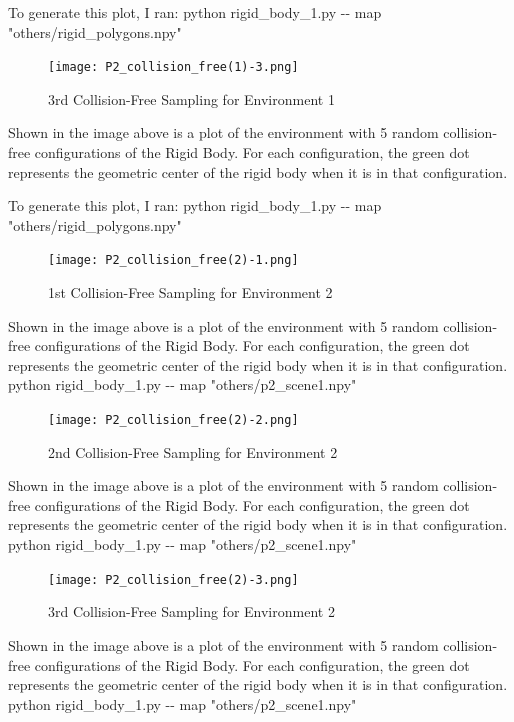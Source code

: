 \documentclass{article}
\begin{document}
To generate this plot, I ran: \newline 
python rigid\_body\_1.py -\-- map "others/rigid\_polygons.npy"


\newpage 
\begin{figure}[h!]
	\texttt{[image: P2\_collision\_free(1)-3.png]}
	\centering
	\caption{3rd Collision-Free Sampling for Environment 1}
	\label{P2_collision_free(1)-3.png}
\end{figure}
Shown in the image above is a plot of the environment with 5 random collision-free configurations of the Rigid Body. For each configuration, the green dot represents the geometric center of the rigid body when it is in that configuration. 

To generate this plot, I ran: \newline 
python rigid\_body\_1.py -\-- map "others/rigid\_polygons.npy"


\newpage 
\begin{figure}[h!]
	\texttt{[image: P2\_collision\_free(2)-1.png]}
	\centering
	\caption{1st Collision-Free Sampling for Environment 2}
	\label{P2_collision_free(2)-1.png}
\end{figure}
Shown in the image above is a plot of the environment with 5 random collision-free configurations of the Rigid Body. For each configuration, the green dot represents the geometric center of the rigid body when it is in that configuration. 
python rigid\_body\_1.py -\-- map "others/p2\_scene1.npy"

\newpage 
\begin{figure}[h!]
	\texttt{[image: P2\_collision\_free(2)-2.png]}
	\centering
	\caption{2nd Collision-Free Sampling for Environment 2}
	\label{P2_collision_free(2)-2.png}
\end{figure}
Shown in the image above is a plot of the environment with 5 random collision-free configurations of the Rigid Body. For each configuration, the green dot represents the geometric center of the rigid body when it is in that configuration. 
python rigid\_body\_1.py -\-- map "others/p2\_scene1.npy"

\newpage 
\begin{figure}[h!]
	\texttt{[image: P2\_collision\_free(2)-3.png]}
	\centering
	\caption{3rd Collision-Free Sampling for Environment 2}
	\label{P2_collision_free(2)-3.png}
\end{figure}
Shown in the image above is a plot of the environment with 5 random collision-free configurations of the Rigid Body. For each configuration, the green dot represents the geometric center of the rigid body when it is in that configuration. 
python rigid\_body\_1.py -\-- map "others/p2\_scene1.npy"
\end{document}
